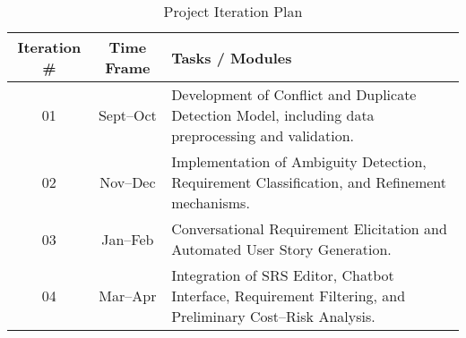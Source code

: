 \begin{table}[!ht]
\caption{Project Iteration Plan} 
\begin{tabular}{|c|c|p{9cm}|} \hline
\textbf{Iteration \#} & \textbf{Time Frame} & \textbf{Tasks / Modules} \\ \hline
01 & Sept–Oct & Development of Conflict and Duplicate Detection Model, including data preprocessing and validation. \\ \hline
02 & Nov–Dec  & Implementation of Ambiguity Detection, Requirement Classification, and Refinement mechanisms. \\ \hline
03 & Jan–Feb  & Conversational Requirement Elicitation and Automated User Story Generation. \\ \hline
04 & Mar–Apr  & Integration of SRS Editor, Chatbot Interface, Requirement Filtering, and Preliminary Cost–Risk Analysis. \\ \hline
\end{tabular}
\end{table}